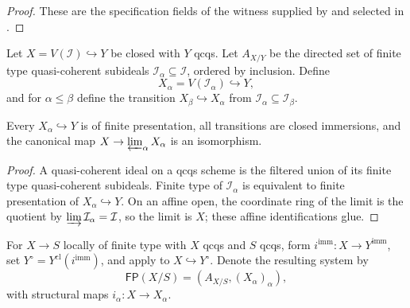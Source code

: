 \begin{proof}
  These are the specification fields of the witness supplied by
   and selected in
  .
\end{proof}

\begin{definition}
  \label{def:nagata-closed-subscheme-fp-system}

  Let $X=V(\mathcal I)\hookrightarrow Y$ be closed with $Y$ qcqs.  Let
  $A_{X/Y}$ be the directed set of finite type quasi-coherent subideals
  $\mathcal I_\alpha\subseteq\mathcal I$, ordered by inclusion.  Define
  \[
    X_\alpha=V(\mathcal I_\alpha)\hookrightarrow Y,
  \]
  and for $\alpha\leq\beta$ define the transition
  $X_\beta\hookrightarrow X_\alpha$ from
  $\mathcal I_\alpha\subseteq\mathcal I_\beta$.
\end{definition}

\begin{lemma}
  \label{lemma:nagata-closed-subscheme-fp-system}

  Every $X_\alpha\hookrightarrow Y$ is of finite presentation, all
  transitions are closed immersions, and the canonical map
  $X\to\varprojlim_\alpha X_\alpha$ is an isomorphism.
\end{lemma}

\begin{proof}
  A quasi-coherent ideal on a qcqs scheme is the filtered union of its finite
  type quasi-coherent subideals.  Finite type of $\mathcal I_\alpha$ is
  equivalent to finite presentation of $X_\alpha\hookrightarrow Y$.  On an
  affine open, the coordinate ring of the limit is the quotient by
  $\varinjlim\mathcal I_\alpha=\mathcal I$, so the limit is $X$; these affine
  identifications glue.
\end{proof}

\begin{definition}
  \label{def:nagata-finite-type-fp-model-system}

  For $X\to S$ locally of finite type with $X$ qcqs and $S$ qcqs, form
  $i^{\mathrm{imm}}\colon X\to Y^{\mathrm{imm}}$, set
  $Y^\circ=Y^{\mathrm{cl}}(i^{\mathrm{imm}})$, and apply
   to
  $X\hookrightarrow Y^\circ$.  Denote the resulting system by
  \[
    \mathsf{FP}(X/S)=(A_{X/S},(X_\alpha)_\alpha),
  \]
  with structural maps $i_\alpha\colon X\to X_\alpha$.
\end{definition}

